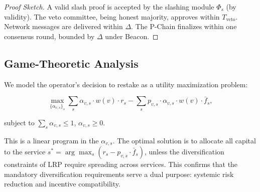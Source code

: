 \begin{proof}[Proof Sketch]
A valid slash proof is accepted by the slashing module $\Phi_s$ (by validity). The veto
committee, being honest majority, approves within $T_{\text{veto}}$. Network messages are
delivered within $\Delta$. The P-Chain finalizes within one consensus round, bounded by
$\Delta$ under Beacon.
\end{proof}

\subsection{Game-Theoretic Analysis}

We model the operator's decision to restake as a utility maximization problem:

\[
  \max_{\{\alpha_{v,s}\}_s} \sum_s \alpha_{v,s} \cdot w(v) \cdot r_s - \sum_s p_{v,s} \cdot \alpha_{v,s} \cdot w(v) \cdot \bar{f}_s,
\]

subject to $\sum_s \alpha_{v,s} \leq 1$, $\alpha_{v,s} \geq 0$.

This is a linear program in the $\alpha_{v,s}$. The optimal solution is to allocate all
capital to the service $s^* = \arg\max_s (r_s - p_{v,s} \cdot \bar{f}_s)$, unless the
diversification constraints of LRP require spreading across services. This confirms that
the mandatory diversification requirements serve a dual purpose: systemic risk reduction
and incentive compatibility.

